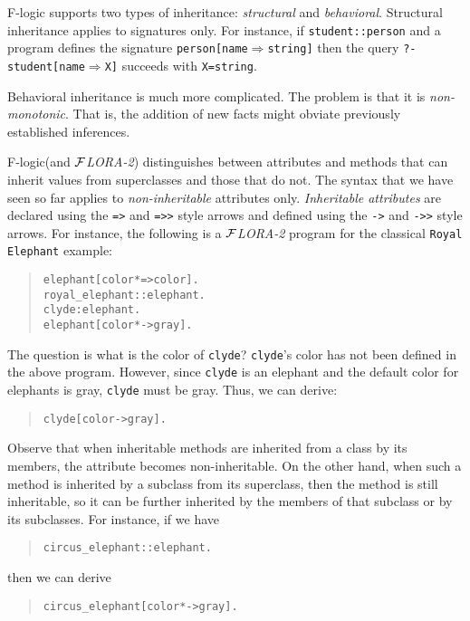 \documentclass[11pt]{article}
\newcommand{\Fd}{\ensuremath{{\Rightarrow}}}                      %
\newcommand{\FLORA}{{\mbox{${\cal F}${\small\it LORA}\rm\emph{-2}}}\xspace}
\newcommand{\fl}{\mbox{F-logic}\xspace}
\begin{document}
\fl supports two types of inheritance: \emph{structural} and
\emph{behavioral}.  Structural inheritance applies to signatures only. For
instance, if {\tt student::person} and a program defines the signature
{\tt person[name{\Fd}string]} then the query {\tt ?- student[name{\Fd}X]}
succeeds with {\tt X=string}.

Behavioral inheritance is much more complicated. The problem  is that it is
\emph{non-monotonic}. That is, the addition of new facts might obviate previously
established inferences.

\fl (and \FLORA) distinguishes between attributes and methods that can
inherit values from superclasses and those that do not. The syntax that we
have seen so far applies to \emph{non-inheritable} attributes only.
\emph{Inheritable attributes} are declared using the {\tt *=>} and {\tt *=>>}
style arrows and defined using the {\tt *->} and {\tt *->>} style arrows. For
instance, the following is a \FLORA program for the classical {\tt Royal
Elephant} example:
\begin{quote}
\begin{verbatim}
elephant[color*=>color].
royal_elephant::elephant.
clyde:elephant.
elephant[color*->gray].
\end{verbatim}
\end{quote}
The question is what is the color of {\tt clyde}?
{\tt clyde}'s color has not been defined in the above program. However, since
{\tt clyde} is an elephant and the default color for elephants is gray,
{\tt clyde}
must be gray. Thus, we can derive:
\begin{quote}
\begin{verbatim}
clyde[color->gray].  
\end{verbatim}
\end{quote}
Observe that when inheritable methods are inherited from a class by its
members, the attribute becomes non-inheritable. On the other hand, when
such a method is inherited by a subclass from its superclass, then the
method is still inheritable, so it can be further inherited by the members
of that subclass or by its subclasses. For instance, if we have
\begin{quote}
\begin{verbatim}
circus_elephant::elephant.
\end{verbatim}
\end{quote}
then we can derive 
\begin{quote}
\begin{verbatim}
circus_elephant[color*->gray].  
\end{verbatim}
\end{quote}
\end{document}
